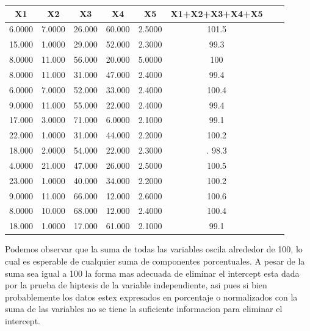 \documentclass[a4paper]{article}
\begin{document}
\begin{center}
    \begin{tabular}{|c|c|c|c|c|c|c|c|}
        \hline
        \textbf{X1}   & \textbf{X2}   & \textbf{X3}   & \textbf{X4}   & \textbf{X5}&\textbf{X1+X2+X3+X4+X5}\\
        \hline
        6.0000  &   7.0000  &   26.000  &   60.000  &  2.5000 & 101.5\\
        \hline
        15.000  &   1.0000  &   29.000  &   52.000  &  2.3000 &  99.3\\
        \hline
        8.0000  &  11.000   &   56.000  &   20.000  &  5.0000 & 100\\
        \hline
        8.0000  &  11.000   &   31.000  &   47.000  &  2.4000 &  99.4\\
        \hline
        6.0000  &   7.0000  &   52.000  &   33.000  &  2.4000 & 100.4\\
        \hline
        9.0000  &  11.000   &   55.000  &   22.000  &  2.4000 &  99.4\\
        \hline
        17.000  &    3.0000 &   71.000  &    6.0000 &  2.1000 &  99.1\\
        \hline
        22.000  &    1.0000 &   31.000  &   44.000  &  2.2000 & 100.2\\
        \hline
        18.000  &    2.0000 &   54.000  &   22.000  &  2.3000 &. 98.3\\
        \hline
        4.0000  &  21.000   &   47.000  &   26.000  &  2.5000 & 100.5\\
        \hline
        23.000  &    1.0000 &   40.000  &   34.000  &  2.2000 & 100.2\\
        \hline
        9.0000  &  11.000   &   66.000  &   12.000  &  2.6000 & 100.6\\
        \hline
        8.0000  &  10.000   &   68.000  &   12.000  &  2.4000 & 100.4\\
        \hline
        18.000  &   1.0000  &   17.000  &   61.000  &  2.1000 &  99.1\\
        \hline
    \end{tabular}
  
\end{center}

Podemos observar que la suma de todas las variables oscila alrededor de 100, lo cual es esperable de cualquier suma de componentes porcentuales.
A pesar de la suma sea igual a 100 la forma mas adecuada de eliminar el intercept esta dada por la prueba de hiptesis de la variable independiente, asi pues si bien probablemente los datos estex expresados en porcentaje o normalizados con la suma de las variables no se tiene la suficiente informacion para eliminar el intercept.
\end{document}
